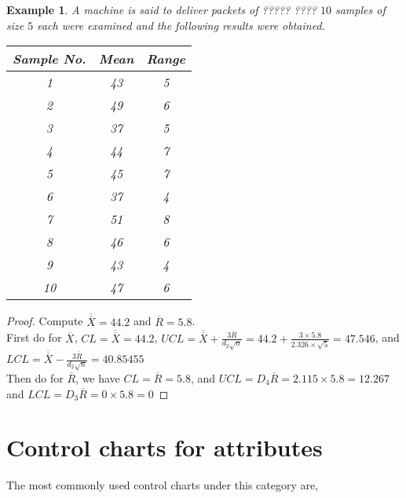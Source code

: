 \documentclass[oneside,11pt,pdftex]{book}%
\numberwithin{equation}{section}
\newtheorem{example}[theorem]{Example}
\numberwithin{section}{chapter}
\numberwithin{equation}{chapter}
\begin{document}
\begin{example}
	A machine is said to deliver packets of ????? ???? $ 10 $ samples of size $ 5 $ each were examined and the following results were obtained.

	\begin{table}[!htb]
		\centering
		\begin{tabular}{@{}ccc@{}}
			\toprule
			Sample No. & Mean & \multicolumn{1}{l}{Range} \\ \midrule
			1 & 43 & 5 \\
			2 & 49 & 6 \\
			3 & 37 & 5 \\
			4 & 44 & 7 \\
			5 & 45 & 7 \\
			6 & 37 & 4 \\
			7 & 51 & 8 \\
			8 & 46 & 6 \\
			9 & 43 & 4 \\
			10 & 47 & 6 \\ \bottomrule
		\end{tabular}
	\end{table}

\end{example}

\begin{proof}
	Compute $ \overline{\overline{X}} = 44.2$ and $ \overline{R}=5.8 $.\\
	First do for $ \overline{X} $,
	$ CL=\overline{\overline{X}}=44.2 $, $ UCL=\overline{\overline{X}}+\frac{3\overline{R}}{d_2 \sqrt{n}}=44.2+\frac{3\times 5.8}{2.326 \times \sqrt{5}}=47.546$, and $ LCL=\overline{\overline{X}}-\frac{3 \overline{R}}{d_2 \sqrt{n}}=40.85455 $ \\
	Then do for $ \overline{R} $, we have $ CL=\overline{R} =5.8$, and $ UCL=D_4\overline{R} =2.115 \times 5.8= 12.267$ and $ LCL=D_3 \overline{R} = 0 \times 5.8=0 $
\end{proof}

\FloatBarrier
\section{Control charts for attributes}
The most commonly used control charts under this category are,
\end{document}
